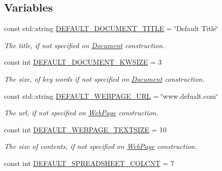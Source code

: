 \subsection*{Variables}
\begin{DoxyCompactItemize}
\item 
\hypertarget{namespacedocs_a4cf6dd6732c7e7ab7f7855e440485d89}{const std\-::string \hyperlink{namespacedocs_a4cf6dd6732c7e7ab7f7855e440485d89}{D\-E\-F\-A\-U\-L\-T\-\_\-\-D\-O\-C\-U\-M\-E\-N\-T\-\_\-\-T\-I\-T\-L\-E} = \char`\"{}Default Title\char`\"{}}\label{namespacedocs_a4cf6dd6732c7e7ab7f7855e440485d89}

\begin{DoxyCompactList}\small\item\em The title, if not specified on \hyperlink{classdocs_1_1Document}{Document} construction. \end{DoxyCompactList}\item 
\hypertarget{namespacedocs_ae635b9481a61628036b5a97625856475}{const int \hyperlink{namespacedocs_ae635b9481a61628036b5a97625856475}{D\-E\-F\-A\-U\-L\-T\-\_\-\-D\-O\-C\-U\-M\-E\-N\-T\-\_\-\-K\-W\-S\-I\-Z\-E} = 3}\label{namespacedocs_ae635b9481a61628036b5a97625856475}

\begin{DoxyCompactList}\small\item\em The size, of key words if not specified on \hyperlink{classdocs_1_1Document}{Document} construction. \end{DoxyCompactList}\item 
\hypertarget{namespacedocs_a9bfb062436ca30729256c522cf54c111}{const std\-::string \hyperlink{namespacedocs_a9bfb062436ca30729256c522cf54c111}{D\-E\-F\-A\-U\-L\-T\-\_\-\-W\-E\-B\-P\-A\-G\-E\-\_\-\-U\-R\-L} = \char`\"{}www.\-defualt.\-com\char`\"{}}\label{namespacedocs_a9bfb062436ca30729256c522cf54c111}

\begin{DoxyCompactList}\small\item\em The url, if not specified on \hyperlink{classdocs_1_1WebPage}{Web\-Page} construction. \end{DoxyCompactList}\item 
\hypertarget{namespacedocs_a966b8c0a825e3e04a2c667abefa97f41}{const int \hyperlink{namespacedocs_a966b8c0a825e3e04a2c667abefa97f41}{D\-E\-F\-A\-U\-L\-T\-\_\-\-W\-E\-B\-P\-A\-G\-E\-\_\-\-T\-E\-X\-T\-S\-I\-Z\-E} = 10}\label{namespacedocs_a966b8c0a825e3e04a2c667abefa97f41}

\begin{DoxyCompactList}\small\item\em The size of contents, if not specified on \hyperlink{classdocs_1_1WebPage}{Web\-Page} construction. \end{DoxyCompactList}\item 
\hypertarget{namespacedocs_aa40437dd2d0305c57f338406303a3f58}{const int \hyperlink{namespacedocs_aa40437dd2d0305c57f338406303a3f58}{D\-E\-F\-A\-U\-L\-T\-\_\-\-S\-P\-R\-E\-A\-D\-S\-H\-E\-E\-T\-\_\-\-C\-O\-L\-C\-N\-T} = 7}\label{namespacedocs_aa40437dd2d0305c57f338406303a3f58}


\end{DoxyCompactItemize}
